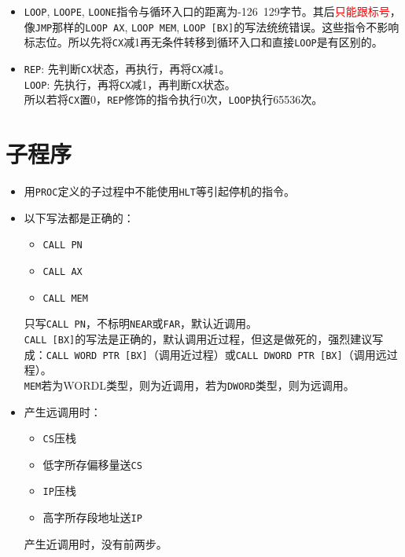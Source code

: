 \documentclass{article}
\begin{document}
\begin{CJK*}{UTF8}{gbsn}
\begin{itemize}
\item
\verb|LOOP|, \verb|LOOPE|, \verb|LOONE|指令与循环入口的距离为-126~129字节。其后\textcolor{red}{只能跟标号}，像\verb|JMP|那样的\verb|LOOP AX|, \verb|LOOP MEM|, \verb|LOOP [BX]|的写法统统错误。这些指令不影响标志位。所以先将\verb|CX|减1再无条件转移到循环入口和直接\verb|LOOP|是有区别的。 \\

\item
\verb|REP|: 先判断\verb|CX|状态，再执行，再将\verb|CX|减1。 \\
\verb|LOOP|: 先执行，再将\verb|CX|减1，再判断\verb|CX|状态。 \\
所以若将\verb|CX|置0，\verb|REP|修饰的指令执行0次，\verb|LOOP|执行65536次。 \\

\end{itemize}

\section{子程序}

\begin{itemize}

\item
用\verb|PROC|定义的子过程中不能使用\verb|HLT|等引起停机的指令。 \\

\item
以下写法都是正确的：
\begin{itemize}
\item \verb|CALL PN|
\item \verb|CALL AX|
\item \verb|CALL MEM|
\end{itemize}
只写\verb|CALL PN|，不标明\verb|NEAR|或\verb|FAR|，默认近调用。 \\
\verb|CALL [BX]|的写法是正确的，默认调用近过程，但这是做死的，强烈建议写成：\verb|CALL WORD PTR [BX]|（调用近过程）或\verb|CALL DWORD PTR [BX]|（调用远过程）。 \\
\verb|MEM|若为WORDL类型，则为近调用，若为\verb|DWORD|类型，则为远调用。 \\

\item
产生远调用时：
\begin{itemize}
\item \verb|CS|压栈
\item 低字所存偏移量送\verb|CS|
\item \verb|IP|压栈
\item 高字所存段地址送\verb|IP|
\end{itemize}
产生近调用时，没有前两步。 \\


\end{itemize}
\end{CJK*}
\end{document}
